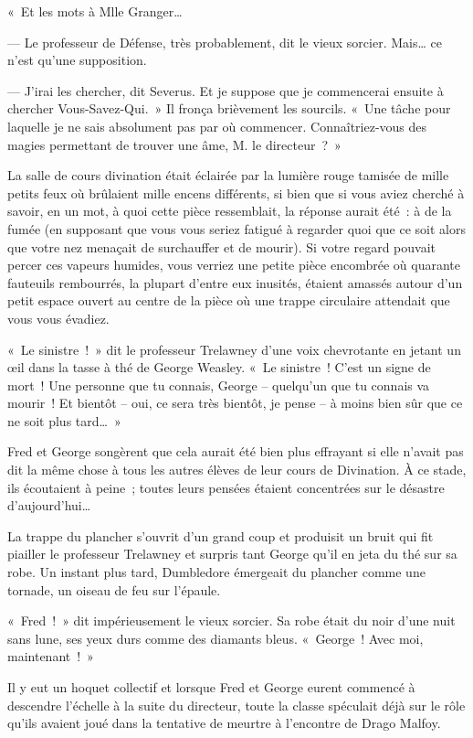 «~Et les mots à Mlle Granger…

--- Le professeur de Défense, très probablement, dit le vieux sorcier. Mais… ce n'est qu'une supposition.

--- J'irai les chercher, dit Severus. Et je suppose que je commencerai ensuite à chercher Vous-Savez-Qui.~» Il fronça brièvement les sourcils. «~Une tâche pour laquelle je ne sais absolument pas par où commencer. Connaîtriez-vous des magies permettant de trouver une âme, M. le directeur~?~»

\later

La salle de cours divination était éclairée par la lumière rouge tamisée de mille petits feux où brûlaient mille encens différents, si bien que si vous aviez cherché à savoir, en un mot, à quoi cette pièce ressemblait, la réponse aurait été~: à de la fumée (en supposant que vous vous seriez fatigué à regarder quoi que ce soit alors que votre nez menaçait de surchauffer et de mourir). Si votre regard pouvait percer ces vapeurs humides, vous verriez une petite pièce encombrée où quarante fauteuils rembourrés, la plupart d'entre eux inusités, étaient amassés autour d'un petit espace ouvert au centre de la pièce où une trappe circulaire attendait que vous vous évadiez.

«~Le sinistre~!~» dit le professeur Trelawney d'une voix chevrotante en jetant un œil dans la tasse à thé de George Weasley. «~Le sinistre~! C'est un signe de mort~! Une personne que tu connais, George -- quelqu'un que tu connais va mourir~! Et bientôt -- oui, ce sera très bientôt, je pense -- à moins bien sûr que ce ne soit plus tard…~»

Fred et George songèrent que cela aurait été bien plus effrayant si elle n'avait pas dit la même chose à tous les autres élèves de leur cours de Divination. À ce stade, ils écoutaient à peine~; toutes leurs pensées étaient concentrées sur le désastre d'aujourd'hui…

La trappe du plancher s'ouvrit d'un grand coup et produisit un bruit qui fit piailler le professeur Trelawney et surpris tant George qu'il en jeta du thé sur sa robe. Un instant plus tard, Dumbledore émergeait du plancher comme une tornade, un oiseau de feu sur l'épaule.

«~Fred~!~» dit impérieusement le vieux sorcier. Sa robe était du noir d'une nuit sans lune, ses yeux durs comme des diamants bleus. «~George~! Avec moi, maintenant~!~»

Il y eut un hoquet collectif et lorsque Fred et George eurent commencé à descendre l'échelle à la suite du directeur, toute la classe spéculait déjà sur le rôle qu'ils avaient joué dans la tentative de meurtre à l'encontre de Drago Malfoy.

